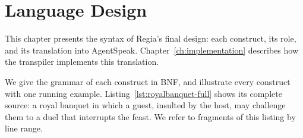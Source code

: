\chapter{Language Design}
\label{ch:design}
 
This chapter presents the syntax of Regia's final design: each construct, its role, and its translation into AgentSpeak. Chapter~\ref{ch:implementation} describes how the transpiler implements this translation.
 
We give the grammar of each construct in BNF, and illustrate every construct with one running example. Listing~\ref{lst:royalbanquet-full} shows its complete source: a royal banquet in which a guest, insulted by the host, may challenge them to a duel that interrupts the feast. We refer to fragments of this listing by line range.
 
